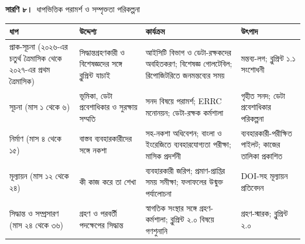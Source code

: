 \documentclass[border=10pt]{standalone}
\begin{document}
\begin{minipage}{17cm}
{\large\bfseries সারণি ৮।}\ {\large ধাপভিত্তিক পরামর্শ ও সম্পৃক্ততা পরিকল্পনা}\par\vspace{7pt}
\small
{}
\begin{tabularx}{\linewidth}{@{}>{\hsize=0.744\hsize\raggedright\arraybackslash}X>{\hsize=1.302\hsize\raggedright\arraybackslash}X>{\hsize=1.209\hsize\raggedright\arraybackslash}X>{\hsize=0.744\hsize\raggedright\arraybackslash}X@{}}
\arrayrulecolor{bapilrule}\toprule
\rowcolor{white}\textbf{ধাপ} & \textbf{উদ্দেশ্য} & \textbf{কার্যক্রম} & \textbf{উৎপাদ} \\
\midrule
প্রাক-সূচনা (২০২৬-এর চতুর্থ ত্রৈমাসিক থেকে ২০২৭-এর প্রথম ত্রৈমাসিক) & সিদ্ধান্তগ্রহণকারী ও বিশেষজ্ঞদের সঙ্গে ব্লুপ্রিন্ট যাচাই & আইসিটি বিভাগ ও ডেটা-রক্ষকদের অবহিতকরণ; বিশেষজ্ঞ গোলটেবিল; রিপোজিটরিতে জনমন্তব্যের সময় & মন্তব্য-লগ; ব্লুপ্রিন্ট ১.১ সংশোধনী \\
সূচনা (মাস ১ থেকে ৬) & ভূমিকা, ডেটা প্রবেশাধিকার ও সুরক্ষায় সম্মতি & সনদ বিষয়ে পরামর্শ; ERRC মনোনয়ন; ডেটা-রক্ষক কর্মশালা & গৃহীত সনদ; ডেটা প্রবেশাধিকার পরিকল্পনা \\
নির্মাণ (মাস ৪ থেকে ১৫) & বাস্তব ব্যবহারকারীদের সঙ্গে নকশা & সহ-নকশা অধিবেশন; বাংলা ও ইংরেজিতে ব্যবহারযোগ্যতা পরীক্ষা; মাসিক প্রদর্শনী & ব্যবহারকারী-পরীক্ষিত পাইলট; কাজের তালিকা প্রকাশিত \\
মূল্যায়ন (মাস ১২ থেকে ২৪) & কী কাজ করে তা শেখা & ব্যবহারকারী জরিপ; প্রমাণ-প্রাপ্তির সময় সমীক্ষা; ফলাফলের উন্মুক্ত পর্যালোচনা & DOI-সহ মূল্যায়ন প্রতিবেদন \\
সিদ্ধান্ত ও সম্প্রসারণ (মাস ২৪ থেকে ৩৬) & গ্রহণ ও পরবর্তী পদক্ষেপের সিদ্ধান্ত & স্বাগতিক সংস্থার সঙ্গে গ্রহণ-কর্মশালা; ব্লুপ্রিন্ট ২.০ বিষয়ে গণশুনানি & গ্রহণ-স্মারক; ব্লুপ্রিন্ট ২.০ \\
\bottomrule
\end{tabularx}
\par{}
\end{minipage}
\end{document}
